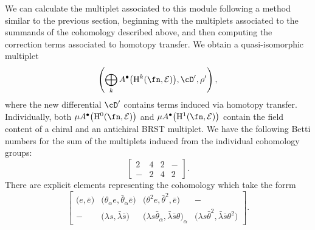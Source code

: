 \documentclass[10pt,a4paper]{amsart}
\numberwithin{equation}{section}
\def\cE{\mathcal E}\def\cF{\mathcal F}\def\cG{\mathcal G}\def\cH{\mathcal H}
\begin{document}
We can calculate the multiplet associated to this module following a method similar to the previous section, beginning with the multiplets associated to the summands of the cohomology described above, and then computing the correction terms associated to homotopy transfer. We obtain a quasi-isomorphic multiplet
\begin{equation*}
\left( \bigoplus_k A^\bullet\big(\mathrm H^k(\fn, \cE)\big) , \cD' , \rho' \right) ,
\end{equation*}
where the new differential $\cD'$ contains terms induced via homotopy transfer. Individually, both $\mu A^\bullet\big(\mathrm H^0(\fn, \cE)\big)$ and $\mu A^\bullet\big(\mathrm H^1(\fn, \cE)\big)$ contain the field content of a chiral and an antichiral BRST multiplet. We have the following Betti numbers for the sum of the multiplets induced from the individual cohomology groups:
\begin{equation*}
\begin{bmatrix}
2 & 4 & 2 & - \\
- & 2 & 4 & 2
\end{bmatrix}.
\end{equation*}
There are explicit elements representing the cohomology which take the forrm
\begin{equation*}
\begin{bmatrix}
\big(e,\bar{e}\big) & \big(\theta_\alpha e ,\bar{\theta}_{\dot \alpha} \bar{e}\big) & \big(\theta^2 e, \bar{\theta}^2 ,\bar{e}\big) & -\\
- & \big(\lambda s , \bar{\lambda} \bar{s}\big) & \big(\lambda s \bar{\theta}_{\dot \alpha} , \bar{\lambda} \bar{s} \theta\big)_\alpha & \big(\lambda s \bar{\theta}^2 , \bar{\lambda} \bar{s} \theta^2\big)
\end{bmatrix} .
\end{equation*}
\end{document}
